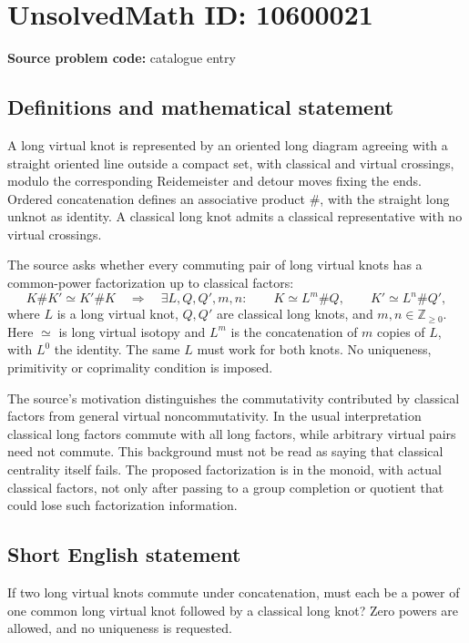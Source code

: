 \documentclass[11pt]{article}
\newcommand{\Z}{\mathbb{Z}}
\begin{document}
\section*{UnsolvedMath ID: 10600021}
\textbf{Source problem code:} catalogue entry
\subsection{Definitions and mathematical statement}
A long virtual knot is represented by an oriented long diagram agreeing with a straight oriented line outside a compact set, with classical and virtual crossings, modulo the corresponding Reidemeister and detour moves fixing the ends. Ordered concatenation defines an associative product \(\#\), with the straight long unknot as identity. A classical long knot admits a classical representative with no virtual crossings.

The source asks whether every commuting pair of long virtual knots has a common-power factorization up to classical factors:
\[
 K\#K'\simeq K'\#K
 \quad\Longrightarrow\quad
 \exists L,Q,Q',m,n:\qquad
 K\simeq L^m\#Q,\qquad K'\simeq L^n\#Q',
\]
where \(L\) is a long virtual knot, \(Q,Q'\) are classical long knots, and \(m,n\in\Z_{\geq0}\). Here \(\simeq\) is long virtual isotopy and \(L^m\) is the concatenation of \(m\) copies of \(L\), with \(L^0\) the identity. The same \(L\) must work for both knots. No uniqueness, primitivity or coprimality condition is imposed.

The source's motivation distinguishes the commutativity contributed by classical factors from general virtual noncommutativity. In the usual interpretation classical long factors commute with all long factors, while arbitrary virtual pairs need not commute. This background must not be read as saying that classical centrality itself fails. The proposed factorization is in the monoid, with actual classical factors, not only after passing to a group completion or quotient that could lose such factorization information.
\subsection{Short English statement}
If two long virtual knots commute under concatenation, must each be a power of one common long virtual knot followed by a classical long knot? Zero powers are allowed, and no uniqueness is requested.
\end{document}
